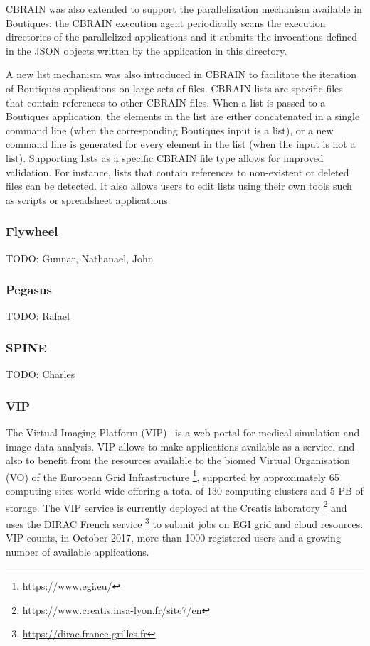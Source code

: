 \documentclass{article}
\newcommand{\todo}[1]{\color{red}TODO: #1\color{black}}
\newcommand{\boutiques}{Boutiques\xspace}
\begin{document}
CBRAIN was also extended to support the parallelization mechanism
available in \boutiques: the CBRAIN execution agent periodically scans
the execution directories of the parallelized applications and it submits
the invocations defined in the JSON objects written by the
application in this directory.

A new list mechanism was also introduced in CBRAIN to facilitate the
iteration of \boutiques applications on large sets of files. CBRAIN
lists are specific files that contain references to other CBRAIN
files. When a list is passed to a \boutiques application, the elements
in the list are either concatenated in a single command line (when the
corresponding \boutiques input is a list), or a new command line is
generated for every element in the list (when the input is not a
list). Supporting lists as a specific CBRAIN file type allows for
improved validation. For instance, lists that contain references to
non-existent or deleted files can be detected. It also allows users to
edit lists using their own tools such as scripts or spreadsheet
applications.

\subsubsection{Flywheel}
\todo{Gunnar, Nathanael, John}

\subsubsection{Pegasus}
\todo{Rafael}

\subsubsection{SPINE}
\todo{Charles}

\subsubsection{VIP}

The Virtual Imaging Platform (VIP)~\cite{GLAT-13} is a web portal for medical 
simulation  and image data analysis. VIP allows to make applications 
available as a service, and also to benefit from the resources available 
to the biomed Virtual Organisation (VO) of the European Grid Infrastructure 
\footnote{\url{https://www.egi.eu/}}, supported by approximately 65 computing
sites world-wide offering a total of 130 computing clusters and 5 PB of storage.
The VIP service is currently deployed at the Creatis laboratory
\footnote{\url{https://www.creatis.insa-lyon.fr/site7/en}} and uses the DIRAC 
French service \footnote{\url{https://dirac.france-grilles.fr}} to submit jobs on 
EGI grid and cloud resources.  VIP counts, in October 2017, more than 1000 
registered users and a growing number of available applications.
\end{document}
